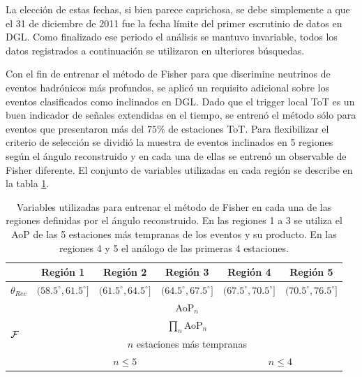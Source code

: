 	La elección de estas fechas, si bien parece caprichosa, se debe simplemente a que el 31 de diciembre de 2011 fue la fecha l\'imite del primer escrutinio de datos en DGL.
	Como finalizado ese periodo el análisis se mantuvo invariable, todos los datos registrados a continuación se utilizaron en ulteriores búsquedas.
	
	Con el fin de entrenar el método de Fisher para que discrimine neutrinos de eventos hadr\'onicos más profundos, se aplicó un requisito adicional sobre los eventos clasificados como inclinados en DGL.
	Dado que el trigger local ToT es un buen indicador de señales extendidas en el tiempo, se entrenó el método sólo para eventos que presentaron más del $75\%$ de estaciones ToT.
	Para flexibilizar el criterio de selección se dividió la muestra de eventos inclinados en 5 regiones según el ángulo reconstruido y en cada una de ellas se entrenó un observable de Fisher diferente.
	El conjunto de variables utilizadas en cada región se describe en la tabla \ref{tab:fisherDGL}. 
	\begin{table}[h!]
		\begin{center}
		\renewcommand{\arraystretch}{1.4}
		\footnotesize
			\begin{tabular}{|l|c|c|c|c|c|}
			\hline
			& Región 1 & Región 2 & Región 3 & Región 4 & Región 5 \\
			\hline
			$\theta_{Rec}$ & $(58.5^\circ,61.5^\circ]$ & $(61.5^\circ,64.5^\circ]$ &$(64.5^\circ,67.5^\circ]$ &$(67.5^\circ,70.5^\circ]$ & $(70.5^\circ,76.5^\circ]$ \\
			\hline
			\multirow{4}{*}{$\cal{F}$}  & \multicolumn{5}{c|}{AoP$_n$} \\
			                 & \multicolumn{5}{c|}{$\prod_n$AoP$_n$} \\
			                 & \multicolumn{5}{c|}{$n$ estaciones más tempranas} \\
			                 & \multicolumn{3}{c|}{$n\leq5$} & \multicolumn{2}{c|}{$n\leq4$} \\
			\hline
			\end{tabular}
			\caption{\label{tab:fisherDGL}
			Variables utilizadas para entrenar el método de Fisher en cada una de las regiones definidas por el ángulo reconstruido. En las regiones 1 a 3 se utiliza el AoP de las 5 estaciones más tempranas de los eventos y su producto. En las regiones 4 y 5 el análogo de las primeras 4 estaciones.}
		\end{center}	 
	\end{table}
	
